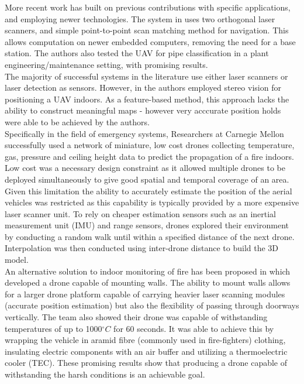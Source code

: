 \documentclass[capstone_report.tex]{subfiles}
\begin{document}
More recent work has built on previous contributions with specific applications, and employing newer technologies. The system in \cite{kumar} uses two orthogonal laser scanners, and simple point-to-point scan matching method for navigation. This allows computation on newer embedded computers, removing the need for a base station. The authors also tested the UAV for pipe classification in a plant engineering/maintenance setting, with promising results.\\

The majority of successful systems in the literature use either laser scanners or laser detection as sensors. However, in \cite{mustafah} the authors employed stereo vision for positioning a UAV indoors. As a feature-based method, this approach lacks the ability to construct meaningful maps - however very acccurate position holds were able to be achieved by the authors.\\

Specifically in the field of emergency systems, Researchers at Carnegie Mellon \cite{sensorfly} successfully used a network of miniature, low cost drones collecting temperature, gas, pressure and ceiling height data to predict the propagation of a fire indoors. Low cost was a necessary design constraint as it allowed multiple drones to be deployed simultaneously to give good spatial and temporal coverage of an area. Given this limitation the ability to accurately estimate the position of the aerial vehicles was restricted as this capability is typically provided by a more expensive laser scanner unit. To rely on cheaper estimation sensors such as an inertial measurement unit (IMU) and range sensors, drones explored their environment by conducting a random walk until within a specified distance of the next drone. Interpolation was then conducted using inter-drone distance to build the 3D model.\\

An alternative solution to indoor monitoring of fire has been proposed in \cite{myeong} which developed a drone capable of mounting walls.  The ability to mount walls allows for a larger drone platform capable of carrying heavier laser scanning modules (accurate position estimation) but also the flexibility of passing through doorways vertically.  The team also showed their drone was capable of withstanding temperatures of up to 1000$^\circ C$ for 60 seconds.  It was able to achieve this by wrapping the vehicle in aramid fibre (commonly used in fire-fighters) clothing, insulating electric components with an air buffer and utilizing a thermoelectric cooler (TEC).  These promising results show that producing a drone capable of withstanding the harsh conditions is an achievable goal.\\
\end{document}
